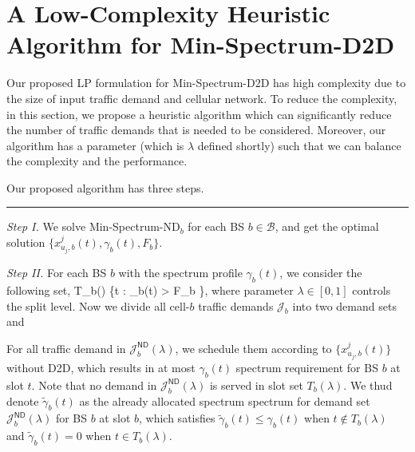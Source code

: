 


\section{A Low-Complexity Heuristic Algorithm for \textsf{Min-Spectrum-D2D}}  \label{sec:heuristic}
Our proposed LP formulation for \textsf{Min-Spectrum-D2D} has high complexity
due to the size of input traffic demand and cellular network.
To reduce the complexity, in this section, we propose a heuristic algorithm which
can significantly reduce the number of traffic demands that is needed to be considered. Moreover,
our algorithm has a parameter (which is $\lambda$ defined shortly)
such that we can balance the complexity and
the performance.

Our proposed algorithm has three steps.
\par\noindent\rule{0.5\textwidth}{0.4pt}

\emph{Step I.}
We solve \textsf{Min-Spectrum-ND}$_b$ for each BS $b \in \mathcal{B}$, and get
the optimal solution $\{x^{j}_{u_j,b}(t), \gamma_b(t), F_b\}$.

\emph{Step II.}
For each BS $b$ with the spectrum profile $\gamma_b(t)$, we consider the following set,
\be
T_b(\lambda) \triangleq \{t \in [T]: \gamma_b(t) > \lambda F_b \},
\label{equ:T-b-lambda}
\ee
where parameter $\lambda \in [0,1]$ controls the split level.
Now we divide all cell-$b$ traffic demands $\mathcal{J}_b$ into two demand sets
\be
{}
\label{equ:D2D-demand-set}
\ee
and
\be
{}
\label{equ:ND-demand-set}
\ee

For all traffic demand in $\mathcal{J}_b^{\textsf{ND}}(\lambda)$, we  schedule them according to $\{x^{j}_{u_j,b}(t)\}$ without D2D,
which results in at most $\gamma_b(t)$ spectrum requirement for BS $b$ at slot $t$.
Note that no demand in $\mathcal{J}_b^{\textsf{ND}}(\lambda)$
is served in slot set $T_b(\lambda)$. We thud denote $\tilde{\gamma}_b(t)$ as
the already allocated spectrum spectrum for demand set $\mathcal{J}_b^{\textsf{ND}}(\lambda)$ for BS $b$ at slot $b$,
which satisfies $\tilde{\gamma}_b(t) \le \gamma_b(t)$ when $t \notin T_b(\lambda)$
and $\tilde{\gamma}_b(t) =0$ when $t \in T_b(\lambda)$.


